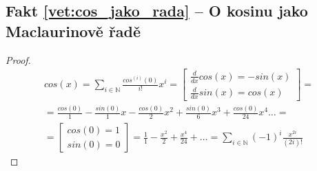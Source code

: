 \subsection{Fakt \ref{vet:cos_jako_rada} -- O kosinu jako Maclaurinově řadě}\label{duk:cos_jako_rada}
\begin{proof}
\begin{equation}
\begin{split}
cos(x)=\sum_{i\in\mathbb{N}}\frac{cos^{(i)}(0)}{i!}x^i=\left[\begin{matrix}\frac{d}{dx} cos(x)=-sin(x) \\ \frac{d}{dx} sin(x)=cos(x) \end{matrix} \right] = \\ =\frac{cos(0)}{1} - \frac{sin(0)}{1}x - \frac{cos(0)}{2}x^2+\frac{sin(0)}{6}x^3+\frac{cos(0)}{24}x^4\ldots=\\=\left[\begin{matrix} cos(0)=1 \\ sin(0)=0 \end{matrix}\right]=\frac{1}{1}-\frac{x^2}{2}+\frac{x^4}{24}+\ldots=\sum_{i\in\mathbb{N}}(-1)^i\frac{x^{2i}}{(2i)!}
\end{split}
\end{equation}
\end{proof}
